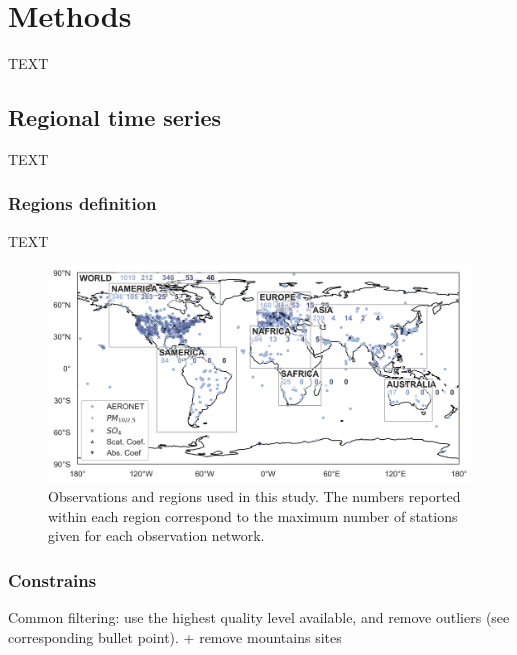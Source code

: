 \documentclass[journal abbreviation, manuscript]{copernicus}
\begin{document}
\section{Methods}
TEXT


\subsection{Regional time series}
TEXT

\subsubsection{Regions definition}
TEXT
\begin{figure}
 \includegraphics[width=12cm]{../scripts/figs/maps/av_obs.png}
 \caption{Observations and regions used in this study. The numbers reported within each region correspond to the maximum number of stations given for each observation network.}
 \label{map_obs}
\end{figure}

\subsubsection{Constrains}

Common filtering: use the highest quality level available, and remove outliers (see corresponding bullet point).
+ remove mountains sites
\end{document}
